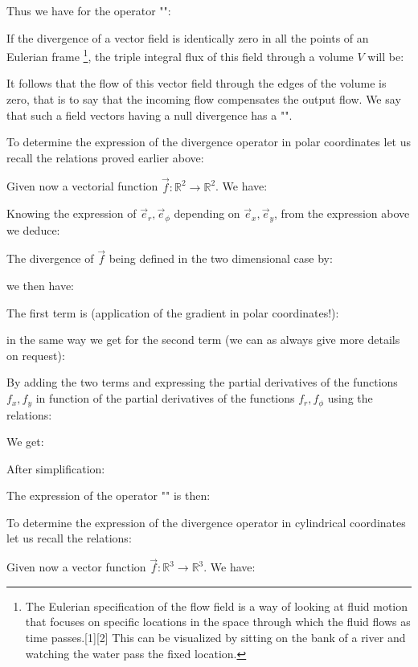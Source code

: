 	Thus we have for the operator "":
	
	If the divergence of a vector field is identically zero in all the points of an Eulerian frame \footnote{The Eulerian specification of the flow field is a way of looking at fluid motion that focuses on specific locations in the space through which the fluid flows as time passes.[1][2] This can be visualized by sitting on the bank of a river and watching the water pass the fixed location.}, the triple integral flux of this field through a volume $V$ will be:
	
	It follows that the flow of this vector field through the edges of the volume is zero, that is to say that the incoming flow compensates the output flow. We say that such a field vectors having a null divergence has a "".
	
	To determine the expression of the divergence operator in polar coordinates let us recall the relations proved earlier above:
	
	Given now a vectorial function $\vec{f}:\mathbb{R}^2\rightarrow \mathbb{R}^2$. We have:
	
	Knowing the expression of $\vec{e}_r,\vec{e}_\phi$ depending on $\vec{e}_x,\vec{e}_y$, from the expression above we deduce:
	
	The divergence of $\vec{f}$ being defined in the two dimensional case by:
	
	we then have:
	
	The first term is (application of the gradient in polar coordinates!):
	
	in the same way we get for the second term (we can as always give more details on request):
	
	By adding the two terms and expressing the partial derivatives of the functions $f_x,f_y$ in function of the partial derivatives of the functions $f_r,f_\phi$ using the relations:
	
	We get:
	
	After simplification:
	
	The expression of the operator "" is then:
	
	To determine the expression of the divergence operator in cylindrical coordinates let us recall the relations:
	
	Given now a vector function $\vec{f}:\mathbb{R}^3\rightarrow \mathbb{R}^3$. We have:
	
